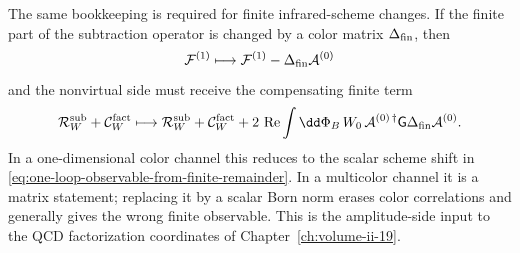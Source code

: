 \begin{controlledapproximation}
The same bookkeeping is required for finite infrared-scheme changes.  If the
finite part of the subtraction operator is changed by a color matrix
\(\Delta_{\rm fin}\), then
\[
  \mathcal F^{(1)}
  \longmapsto
  \mathcal F^{(1)}-\Delta_{\rm fin}\mathcal A^{(0)}
\]
and the nonvirtual side must receive the compensating finite term
\begin{equation}
  \mathcal R_W^{\rm sub}+\mathcal C_W^{\rm fact}
  \longmapsto
  \mathcal R_W^{\rm sub}+\mathcal C_W^{\rm fact}
  +
  2\,\operatorname{Re}
  \int\dd\Phi_B\,W_0\,
  \mathcal A^{(0)\,\dagger}\mathsf G
  \Delta_{\rm fin}\mathcal A^{(0)} .
  \label{eq:color-space-finite-scheme-transport}
\end{equation}
In a one-dimensional color channel this reduces to the scalar scheme shift in
\eqref{eq:one-loop-observable-from-finite-remainder}.  In a multicolor
channel it is a matrix statement; replacing it by a scalar Born norm erases
color correlations and generally gives the wrong finite observable.  This is
the amplitude-side input to the QCD factorization coordinates of
Chapter~\ref{ch:volume-ii-19}.
\end{controlledapproximation}

